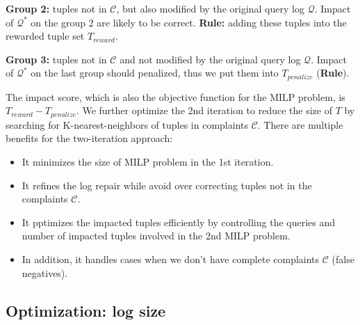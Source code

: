 \smallskip

\noindent\textbf{Group 2:} tuples not in $\mathcal{C}$, but also modified 
by the original query log $\mathcal{Q}$. Impact of $\mathcal{Q}^*$ 
on the group 2 are likely to
be correct. \textbf{Rule:} adding these tuples into the 
rewarded tuple set $T_{reward}$. 

\smallskip

\noindent\textbf{Group 3:} tuples not in $\mathcal{C}$ and not modified 
by the original query log $\mathcal{Q}$. Impact of 
$\mathcal{Q}^*$ on the last group should penalized, thus 
we put them into $T_{penalize}$ (\textbf{Rule}).

\smallskip

The impact score, which is also the objective function for
the MILP problem, is $T_{reward} - T_{penalize}$. We further 
optimize the 2nd iteration to reduce the size of $T$ 
by searching for K-nearest-neighbors
of tuples in complaints $\mathcal{C}$. 
There are multiple benefits for the two-iteration approach:
\begin{itemize}
\item It minimizes the size of MILP problem in the 1st iteration. 
\item It refines the log repair while avoid over correcting tuples not in 
the complaints $\mathcal{C}$. 
\item It pptimizes the impacted tuples efficiently by controlling the queries 
and number of impacted tuples
involved in the 2nd MILP problem.
\item In addition, it handles cases when we don't have complete complaints
$\mathcal{C}$ (false negatives). 
\end{itemize}
\subsection{Optimization: log size}


